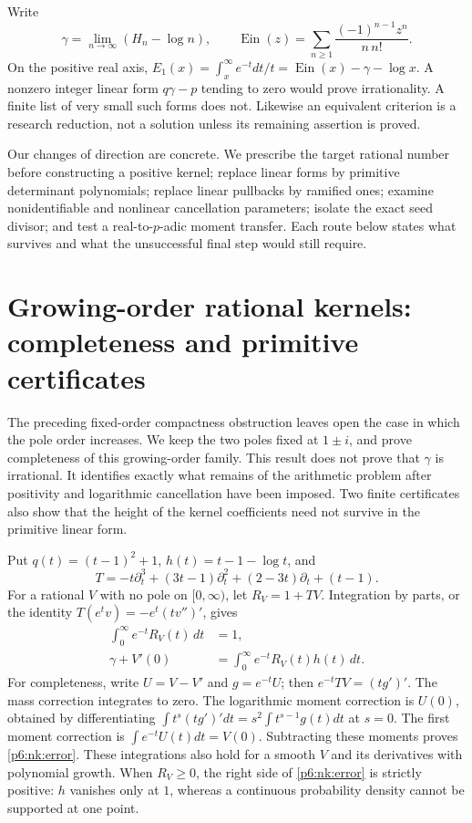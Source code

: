 \documentclass[11pt,a4paper]{article}
\theoremstyle{definition}
\theoremstyle{remark}
\DeclareMathOperator{\Ein}{Ein}
\numberwithin{equation}{section}
\begin{document}
Write
\[
 \gamma=\lim_{n\to\infty}(H_n-\log n),\qquad
 \Ein(z)=\sum_{n\ge1}\frac{(-1)^{n-1}z^n}{n\,n!}.
\]
On the positive real axis,
$E_1(x)=\int_x^\infty e^{-t}dt/t
=\Ein(x)-\gamma-\log x$.
A nonzero integer linear form $q\gamma-p$ tending to zero would
prove irrationality. A finite list of very small such forms does not.
Likewise an equivalent criterion is a research reduction, not a
solution unless its remaining assertion is proved.

Our changes of direction are concrete. We prescribe the target
rational number before constructing a positive kernel; replace
linear forms by primitive determinant polynomials; replace linear
pullbacks by ramified ones; examine nonidentifiable and nonlinear
cancellation parameters; isolate the exact seed divisor; and test
a real-to-$p$-adic moment transfer. Each route below states what
survives and what the unsuccessful final step would still require.


\section{Growing-order rational kernels: completeness and primitive certificates}
\label{p6:sec:next-kernel}
The preceding fixed-order compactness obstruction leaves open the case in
which the pole order increases. We keep the two poles fixed at $1\pm i$,
and prove completeness of this growing-order family. This result does not
prove that $\gamma$ is irrational. It identifies exactly what remains of
the arithmetic problem after positivity and logarithmic cancellation have
been imposed. Two finite certificates also show that the height of the
kernel coefficients need not survive in the primitive linear form.

Put $q(t)=(t-1)^2+1$, $h(t)=t-1-\log t$, and
\[
 T=-t\partial_t^3+(3t-1)\partial_t^2+(2-3t)\partial_t+(t-1).
\]
For a rational $V$ with no pole on $[0,\infty)$, let $R_V=1+TV$.
Integration by parts, or the identity
$T(e^t v)=-e^t(tv'')'$, gives
\begin{align}
 \int_0^\infty e^{-t}R_V(t)\,dt&=1,\label{p6:nk:mass}\\
 \gamma+V'(0)&=\int_0^\infty e^{-t}R_V(t)h(t)\,dt.
 \label{p6:nk:error}
\end{align}
For completeness, write $U=V-V'$ and $g=e^{-t}U$; then
$e^{-t}TV=(tg')'$. The mass correction integrates to zero.
The logarithmic moment correction is $U(0)$, obtained by differentiating
$\int t^s(tg')'dt=s^2\int t^{s-1}g(t)dt$ at $s=0$.
The first moment correction is $\int e^{-t}U(t)dt=V(0)$.
Subtracting these moments proves \eqref{p6:nk:error}. These integrations also
hold for a smooth $V$ and its derivatives with polynomial growth. When
$R_V\geq0$, the right side of \eqref{p6:nk:error} is strictly positive:
$h$ vanishes only at $1$, whereas a continuous probability density cannot
be supported at one point.
\end{document}

